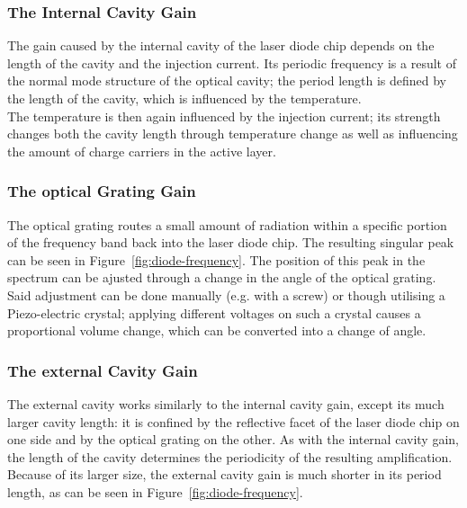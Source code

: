 \subsubsection{The Internal Cavity Gain}
\label{sec:internalcavitgain}
The gain caused by the internal cavity of the laser diode chip depends on the length of the cavity and the
injection current. Its periodic frequency is a result of the normal mode structure of the optical cavity; the
period length is defined by the length of the cavity, which is influenced by the temperature. \\
The temperature is then again influenced by the injection current; its strength changes both the cavity length
through temperature change as well as influencing the amount of charge carriers in the active layer.
\subsubsection{The optical Grating Gain}
\label{sec:opticalgratinggain}
The optical grating routes a small amount of radiation within a specific portion of the frequency band back
into the laser diode chip. The resulting singular peak can be seen in Figure~\ref{fig:diode-frequency}.
The position of this peak in the spectrum can be ajusted through a change in the angle of the optical grating.
Said adjustment can be done manually (e.g. with a screw) or though utilising a Piezo-electric crystal;
applying different voltages on such a crystal causes a proportional volume change, which can be converted into
a change of angle.
\subsubsection{The external Cavity Gain}
\label{sec:externalcavitygain}
The external cavity works similarly to the internal cavity gain, except its much larger cavity length: it is
confined by the reflective facet of the laser diode chip on one side and by the optical grating on the other.
As with the internal cavity gain, the length of the cavity determines the periodicity of the resulting
amplification. Because of its larger size, the external cavity gain is much shorter in its period length, as
can be seen in Figure~\ref{fig:diode-frequency}.
